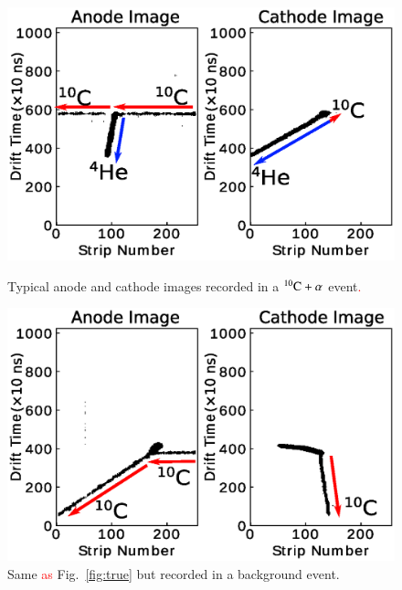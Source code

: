 \documentclass{jps-cp}
\begin{document}
\begin{figure}
  \centering
  \begin{minipage}{0.45\columnwidth}
    \centering
    \includegraphics[clip, width=0.9\columnwidth]{eps/true.eps}
    \caption{Typical anode and cathode images recorded in a ${}^{10}\rm{C}+\alpha$ event\textcolor{red}{.}}
    \label{fig:true}
  \end{minipage}
  \hfill
  \begin{minipage}{0.45\columnwidth}
    \centering
    \includegraphics[clip, width=0.9\columnwidth]{eps/false.eps}
    \caption{Same \textcolor{red}{as} Fig.~\ref{fig:true} but recorded in a background event.}
    \label{fig:false}
  \end{minipage}
\end{figure}
\end{document}
